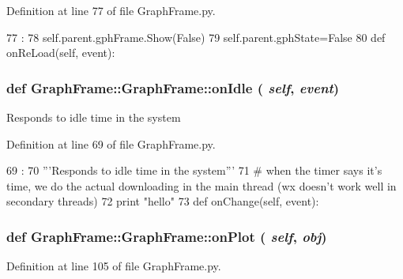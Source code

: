 Definition at line 77 of file GraphFrame.py.


\begin{DoxyCode}
77                               :
78         self.parent.gphFrame.Show(False)
79         self.parent.gphState=False
80 
    def onReLoad(self, event):
\end{DoxyCode}
\hypertarget{classGraphFrame_1_1GraphFrame_adc2631db029ab67454476c812fd1af49}{
\subsubsection[{onIdle}]{\setlength{\rightskip}{0pt plus 5cm}def GraphFrame::GraphFrame::onIdle ( {\em self}, \/   {\em event})}}
\label{classGraphFrame_1_1GraphFrame_adc2631db029ab67454476c812fd1af49}
\begin{DoxyVerb}Responds to idle time in the system\end{DoxyVerb}
 

Definition at line 69 of file GraphFrame.py.


\begin{DoxyCode}
69                            :
70         '''Responds to idle time in the system'''
71         # when the timer says it's time, we do the actual downloading in the main
       thread (wx doesn't work well in secondary threads)
72         print "hello"        
73 
    def onChange(self, event):
\end{DoxyCode}
\hypertarget{classGraphFrame_1_1GraphFrame_aec9380a98a61e0544580ced8878aec36}{
\subsubsection[{onPlot}]{\setlength{\rightskip}{0pt plus 5cm}def GraphFrame::GraphFrame::onPlot ( {\em self}, \/   {\em obj})}}
\label{classGraphFrame_1_1GraphFrame_aec9380a98a61e0544580ced8878aec36}


Definition at line 105 of file GraphFrame.py.


